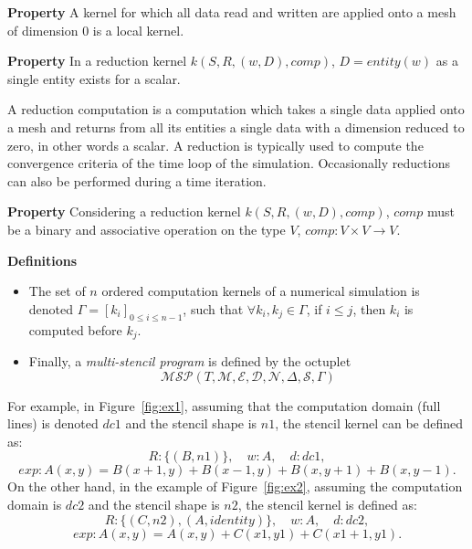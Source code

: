 \noindent \textbf{Property}
A kernel for which all data read and written are applied onto a mesh of dimension $0$ is a local kernel.

\noindent \textbf{Property}
In a reduction kernel $k(S,R,(w,D),comp)$, $D=entity(w)$ as a single entity exists for a scalar.

\medskip
A reduction computation is a computation which takes a single data applied onto a mesh and returns from all its entities a single data with a dimension reduced to zero, in other words a scalar. A reduction is typically used to compute the convergence criteria of the time loop of the simulation. Occasionally reductions can also be performed during a time iteration. %

\medskip
\noindent \textbf{Property}
Considering a reduction kernel $k(S,R,(w,D),comp)$, $comp$ must be a binary and associative operation on the type $V$, $comp: V \times V \rightarrow V$.

\medskip
\noindent \textbf{Definitions}
\begin{itemize}
\item The set of $n$ ordered computation kernels of a numerical simulation is denoted $\Gamma = [k_i]_{0 \leq i \leq n-1}$, such that $\forall k_i,k_j \in \Gamma$, if $i \leq j$, then $k_i$ is computed before $k_j$.
\item Finally, a \textit{multi-stencil program} is defined by the octuplet 
\begin{equation*}
\mathcal{MSP}(T,\mathcal{M},\mathcal{E},\mathcal{D},\mathcal{N},\Delta, \mathcal{S},\Gamma)
\end{equation*}
\end{itemize}

For example, in Figure~\ref{fig:ex1}, assuming that the computation domain (full lines) is denoted $dc1$ and the stencil shape is $n1$, the stencil kernel can be defined as:
\begin{equation*}
R: \{(B,n1)\}, \quad w: A, \quad d: dc1,
\end{equation*}
\begin{equation*}
exp: A(x,y)=B(x+1,y)+B(x-1,y)+B(x,y+1)+B(x,y-1).
\end{equation*}
On the other hand, in the example of Figure~\ref{fig:ex2}, assuming the computation domain is $dc2$ and the stencil shape is $n2$, the stencil kernel is defined as:
\begin{equation*}
R: \{(C,n2),(A,identity)\}, \quad w: A, \quad d: dc2,
\end{equation*}
\begin{equation*}
exp: A(x,y)=A(x,y)+C(x1,y1)+C(x1+1,y1).
\end{equation*}

